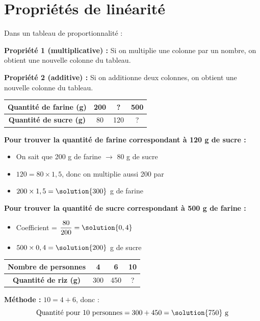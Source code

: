 \section{Propriétés de linéarité}

\begin{proprietebox}
	Dans un tableau de proportionnalité :

	\textbf{Propriété 1 (multiplicative) :} Si on multiplie une colonne par un nombre, on obtient une nouvelle colonne du tableau.

	\textbf{Propriété 2 (additive) :} Si on additionne deux colonnes, on obtient une nouvelle colonne du tableau.
\end{proprietebox}

\begin{examplebox}
	\begin{center}
		\renewcommand{\arraystretch}{1.5}
		\begin{tabular}{|c|c|c|c|}
			\hline
			\textbf{Quantité de farine (g)} & 200 & ? & 500 \\
			\hline
			\textbf{Quantité de sucre (g)} & 80 & 120 & ? \\
			\hline
		\end{tabular}
	\end{center}

	\textbf{Pour trouver la quantité de farine correspondant à 120 g de sucre :}
	\begin{itemize}
		\item On sait que 200 g de farine $\rightarrow$ 80 g de sucre
		\item $120 = 80 \times 1,5$, donc on multiplie aussi 200 par 
		\item $200 \times 1,5 = \solution{300}$ g de farine
	\end{itemize}

	\textbf{Pour trouver la quantité de sucre correspondant à 500 g de farine :}
	\begin{itemize}
		\item Coefficient = $\dfrac{80}{200} = \solution{0,4}$
		\item $500 \times 0,4 = \solution{200}$ g de sucre
	\end{itemize}
\end{examplebox}

\begin{examplebox}
	\begin{center}
		\renewcommand{\arraystretch}{1.5}
		\begin{tabular}{|c|c|c|c|}
			\hline
			\textbf{Nombre de personnes} & 4 & 6 & 10 \\
			\hline
			\textbf{Quantité de riz (g)} & 300 & 450 & ? \\
			\hline
		\end{tabular}
	\end{center}

	\textbf{Méthode :} $10 = 4 + 6$, donc :
	$$\text{Quantité pour 10 personnes} = 300 + 450 = \solution{750} \text{ g}$$
\end{examplebox}

